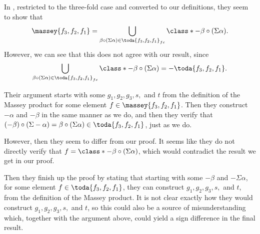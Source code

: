 \begin{remark}
    In \cite[Proposition 4.2.8]{Jasso-Muro_2023}, restricted to the three-fold case and converted to our definitions, they seem to show that
    \[
        \massey{f_3, f_2, f_1} = \bigcup_{\beta \circ (\Sigma \alpha) \in \toda{f_3, f_2, f_1}_{fc}}  \class*{- \beta \circ (\Sigma \alpha)}.
    \]
    However, we can see that this does not agree with our result, since
    \[
        \bigcup_{\beta \circ (\Sigma \alpha) \in \toda{f_3, f_2, f_1}_{fc}}  \class*{- \beta \circ (\Sigma \alpha)} = -\toda{f_3, f_2, f_1}.
    \]

    Their argument starts with some \( g_1, g_2, g_3, s, \) and \( t \) from the definition of the Massey product for some element \( f \in \massey{f_3, f_2, f_1} \). Then they construct \( -\alpha \) and \( -\beta \) in the same manner as we do, and then they verify that \( (-\beta) \circ (\Sigma -\alpha) = \beta \circ (\Sigma \alpha) \in \toda{f_3, f_2, f_1} \), just as we do.

    However, then they seem to differ from our proof. It seems like they do not directly verify that \( f = \class*{- \beta \circ (\Sigma \alpha)} \), which would contradict the result we get in our proof.

    Then they finish up the proof by stating that starting with some \( -\beta \) and \( -\Sigma \alpha \), for some element \( f \in \toda{f_3, f_2, f_1} \), they can construct \( g_1, g_2, g_3, s, \) and \( t \), from the definition of the Massey product. It is not clear exactly how they would construct \( g_1, g_2, g_3, s, \) and \( t \), so this could also be a source of misunderstanding which, together with the argument above, could yield a sign difference in the final result.
\end{remark}
